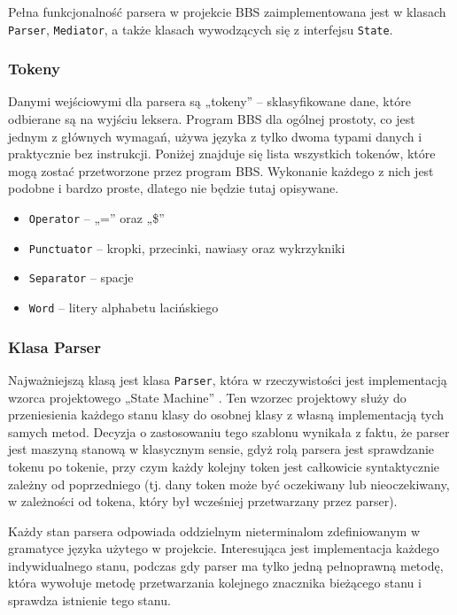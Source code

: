 Pełna funkcjonalność parsera w projekcie BBS zaimplementowana jest w klasach \texttt{Parser}, \texttt{Mediator}, a także klasach wywodzących się z interfejsu \texttt{State}.

\subsubsection{Tokeny}

Danymi wejściowymi dla parsera są „tokeny” -- sklasyfikowane dane, które odbierane są na wyjściu leksera. Program BBS dla ogólnej prostoty, co jest jednym z głównych wymagań, używa języka z tylko dwoma typami danych i praktycznie bez instrukcji. Poniżej znajduje się lista wszystkich tokenów, które mogą zostać przetworzone przez program BBS. Wykonanie każdego z nich jest podobne i bardzo proste, dlatego nie będzie tutaj opisywane.

\begin{itemize}
	\item \texttt{Operator} -- „=” oraz „\$”
	\item \texttt{Punctuator} -- kropki, przecinki, nawiasy oraz wykrzykniki
	\item \texttt{Separator} -- spacje
	\item \texttt{Word} -- litery alphabetu lacińskiego
\end{itemize}

\subsubsection{Klasa Parser}

Najważniejszą klasą jest klasa \texttt{Parser}, która w rzeczywistości jest implementacją wzorca projektowego „State Machine” \cite{state}. Ten wzorzec projektowy służy do przeniesienia każdego stanu klasy do osobnej klasy z własną implementacją tych samych metod. Decyzja o zastosowaniu tego szablonu wynikała z faktu, że parser jest maszyną stanową w klasycznym sensie, gdyż rolą parsera jest sprawdzanie tokenu po tokenie, przy czym każdy kolejny token jest całkowicie syntaktycznie zależny od poprzedniego (tj. dany token może być oczekiwany lub nieoczekiwany, w zależności od tokena, który był wcześniej przetwarzany przez parser).

Każdy stan parsera odpowiada oddzielnym nieterminalom zdefiniowanym w gramatyce języka użytego w projekcie. Interesująca jest implementacja każdego indywidualnego stanu, podczas gdy parser ma tylko jedną pełnoprawną metodę, która wywołuje metodę przetwarzania kolejnego znacznika bieżącego stanu i sprawdza istnienie tego stanu.


